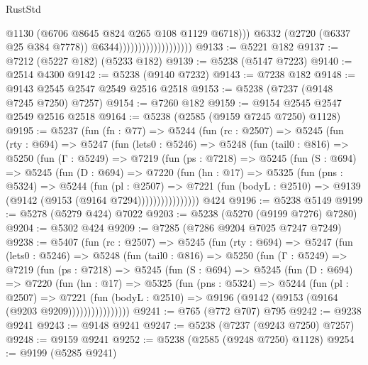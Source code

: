 \begin{lexlean}{RustStd}
\begin{coremodule}
                                              @1130
                                              (@6706 @8645 @824 @265 @108 @1129 @6718)))
                                          @6332
                                          (@2720 (@6337 @25 @384 @7778))
                                          @6344)))))))))))))))))))
@9133 := @5221 @182
@9137 := @7212 (@5227 @182) (@5233 @182)
@9139 := @5238 (@5147 @7223)
@9140 := @2514 @4300
@9142 := @5238 (@9140 @7232)
@9143 := @7238 @182
@9148 := @9143 @2545 @2547 @2549 @2516 @2518
@9153 := @5238 (@7237 (@9148 @7245 @7250) @7257)
@9154 := @7260 @182
@9159 := @9154 @2545 @2547 @2549 @2516 @2518
@9164 := @5238 (@2585 (@9159 @7245 @7250) @1128)
@9195 := @5237
    (fun (fn : @77) =>
    @5244
      (fun (rc : @2507) =>
      @5245
        (fun (rty : @694) =>
        @5247
          (fun (lets0 : @5246) =>
          @5248
            (fun (tail0 : @816) =>
            @5250
              (fun (Γ : @5249) =>
              @7219
                (fun (ps : @7218) =>
                @5245
                  (fun (S : @694) =>
                  @5245
                    (fun (D : @694) =>
                    @7220
                      (fun (hn : @17) =>
                      @5325
                        (fun (pns : @5324) =>
                        @5244
                          (fun (pl : @2507) =>
                          @7221
                            (fun (bodyL : @2510) => @9139 (@9142 (@9153 (@9164 @7294))))))))))))))))
    @424
@9196 := @5238 @5149
@9199 := @5278 (@5279 @424) @7022
@9203 := @5238 (@5270 (@9199 @7276) @7280)
@9204 := @5302 @424
@9209 := @7285 (@7286 @9204 @7025 @7247 @7249)
@9238 := @5407
    (fun (rc : @2507) =>
    @5245
      (fun (rty : @694) =>
      @5247
        (fun (lets0 : @5246) =>
        @5248
          (fun (tail0 : @816) =>
          @5250
            (fun (Γ : @5249) =>
            @7219
              (fun (ps : @7218) =>
              @5245
                (fun (S : @694) =>
                @5245
                  (fun (D : @694) =>
                  @7220
                    (fun (hn : @17) =>
                    @5325
                      (fun (pns : @5324) =>
                      @5244
                        (fun (pl : @2507) =>
                        @7221
                          (fun (bodyL : @2510) =>
                          @9196 (@9142 (@9153 (@9164 (@9203 @9209))))))))))))))))
@9241 := @765 (@772 @707) @795
@9242 := @9238 @9241
@9243 := @9148 @9241
@9247 := @5238 (@7237 (@9243 @7250) @7257)
@9248 := @9159 @9241
@9252 := @5238 (@2585 (@9248 @7250) @1128)
@9254 := @9199 (@5285 @9241)

\end{coremodule}
\end{lexlean}
